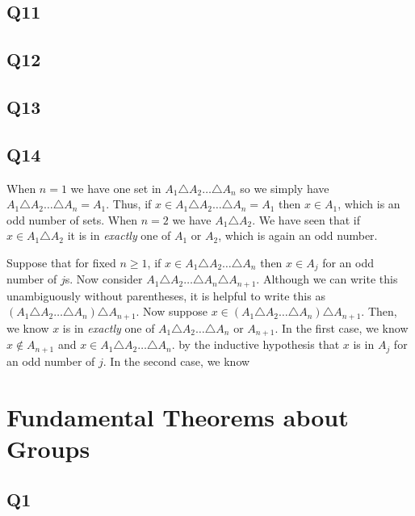 \documentclass[12pt]{article}
\numberwithin{theorem}{section}
\numberwithin{equation}{section}
\numberwithin{remark}{section}
\numberwithin{definition}{section}
\numberwithin{theorem}{section}
\numberwithin{lemma}{section}
\numberwithin{example}{section}
\begin{document}
\subsection{Q11}

\subsection{Q12}

\subsection{Q13}

\subsection{Q14}

When $n=1$ we have one set in $A_1\triangle A_2\ldots \triangle A_n$ so we simply have $A_1\triangle A_2\ldots \triangle A_n=A_1$. Thus, if $x\in A_1\triangle A_2\ldots \triangle A_n=A_1$ then $x\in A_1$, which is an odd number of sets. When $n=2$ we have $A_1\triangle A_2$. We have seen that if $x\in A_1\triangle A_2$ it is in \emph{exactly} one of $A_1$ or $A_2$, which is again an odd number.

Suppose that for fixed $n\ge 1$, if $x\in A_1\triangle A_2\ldots \triangle A_n$ then $x\in A_j$ for an odd number of $j$s. Now consider $A_1\triangle A_2\ldots \triangle A_n\triangle A_{n+1}$. Although we can write this unambiguously without parentheses, it is helpful to write this as $(A_1\triangle A_2\ldots \triangle A_n) \triangle A_{n+1}$. Now suppose $x\in(A_1\triangle A_2\ldots \triangle A_n) \triangle A_{n+1}$. Then, we know $x$ is in \emph{exactly} one of $A_1\triangle A_2\ldots \triangle A_n$ or $A_{n+1}$. In the first case, we know $x\notin A_{n+1}$ and $x\in A_1\triangle A_2\ldots \triangle A_n$. by the inductive hypothesis that $x$ is in $A_j$ for an odd number of $j$. In the second case, we know 





\newpage

\section{Fundamental Theorems about Groups}

\subsection{Q1}
\end{document}
